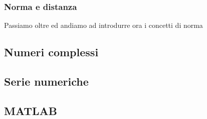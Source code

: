 \documentclass[../main.tex]{subfiles}
\begin{document}
\subsubsection{Norma e distanza}

Passiamo oltre ed andiamo ad introdurre ora i concetti di norma 





\subsection{Numeri complessi}
\subsection{Serie numeriche}
\subsection{MATLAB}

\end{document}
